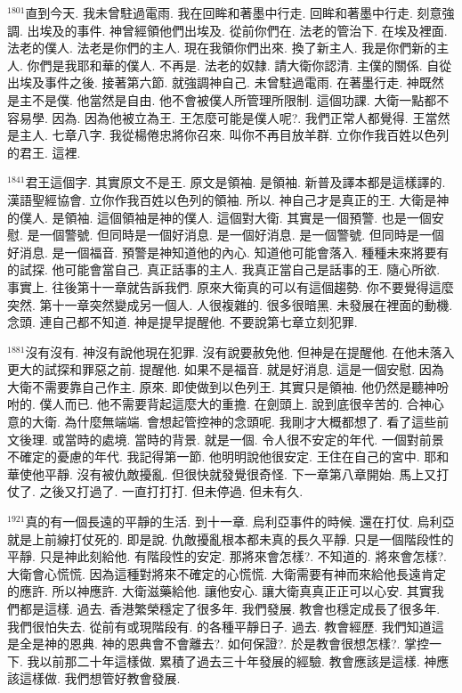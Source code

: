 \documentclass{book}
\begin{document}
$^{1801}$直到今天.
我未曾駐過電雨.
我在回眸和著墨中行走.
回眸和著墨中行走.
刻意強調.
出埃及的事件.
神曾經領他們出埃及.
從前你們在.
法老的管治下.
在埃及裡面.
法老的僕人.
法老是你們的主人.
現在我領你們出來.
換了新主人.
我是你們新的主人.
你們是我耶和華的僕人.
不再是.
法老的奴隸.
請大衛你認清.
主僕的關係.
自從出埃及事件之後.
接著第六節.
就強調神自己.
未曾駐過電雨.
在著墨行走.
神既然是主不是僕.
他當然是自由.
他不會被僕人所管理所限制.
這個功課.
大衛一點都不容易學.
因為.
因為他被立為王.
王怎麼可能是僕人呢?.
我們正常人都覺得.
王當然是主人.
七章八字.
我從楊倦忠將你召來.
叫你不再目放羊群.
立你作我百姓以色列的君王.
這裡.

$^{1841}$君王這個字.
其實原文不是王.
原文是領袖.
是領袖.
新普及譯本都是這樣譯的.
漢語聖經協會.
立你作我百姓以色列的領袖.
所以.
神自己才是真正的王.
大衛是神的僕人.
是領袖.
這個領袖是神的僕人.
這個對大衛.
其實是一個預警.
也是一個安慰.
是一個警號.
但同時是一個好消息.
是一個好消息.
是一個警號.
但同時是一個好消息.
是一個福音.
預警是神知道他的內心.
知道他可能會落入.
種種未來將要有的試探.
他可能會當自己.
真正話事的主人.
我真正當自己是話事的王.
隨心所欲.
事實上.
往後第十一章就告訴我們.
原來大衛真的可以有這個趨勢.
你不要覺得這麼突然.
第十一章突然變成另一個人.
人很複雜的.
很多很暗黑.
未發展在裡面的動機.
念頭.
連自己都不知道.
神是提早提醒他.
不要說第七章立刻犯罪.

$^{1881}$沒有沒有.
神沒有說他現在犯罪.
沒有說要赦免他.
但神是在提醒他.
在他未落入更大的試探和罪惡之前.
提醒他.
如果不是福音.
就是好消息.
這是一個安慰.
因為大衛不需要靠自己作主.
原來.
即使做到以色列王.
其實只是領袖.
他仍然是聽神吩咐的.
僕人而已.
他不需要背起這麼大的重擔.
在劍頭上.
說到底很辛苦的.
合神心意的大衛.
為什麼無端端.
會想起管控神的念頭呢.
我剛才大概都想了.
看了這些前文後理.
或當時的處境.
當時的背景.
就是一個.
令人很不安定的年代.
一個對前景不確定的憂慮的年代.
我記得第一節.
他明明說他很安定.
王住在自己的宮中.
耶和華使他平靜.
沒有被仇敵擾亂.
但很快就發覺很奇怪.
下一章第八章開始.
馬上又打仗了.
之後又打過了.
一直打打打.
但未停過.
但未有久.

$^{1921}$真的有一個長遠的平靜的生活.
到十一章.
烏利亞事件的時候.
還在打仗.
烏利亞就是上前線打仗死的.
即是說.
仇敵擾亂根本都未真的長久平靜.
只是一個階段性的平靜.
只是神此刻給他.
有階段性的安定.
那將來會怎樣?.
不知道的.
將來會怎樣?.
大衛會心慌慌.
因為這種對將來不確定的心慌慌.
大衛需要有神而來給他長遠肯定的應許.
所以神應許.
大衛滋藥給他.
讓他安心.
讓大衛真真正正可以心安.
其實我們都是這樣.
過去.
香港繁榮穩定了很多年.
我們發展.
教會也穩定成長了很多年.
我們很怕失去.
從前有或現階段有.
的各種平靜日子.
過去.
教會經歷.
我們知道這是全是神的恩典.
神的恩典會不會離去?.
如何保證?.
於是教會很想怎樣?.
掌控一下.
我以前那二十年這樣做.
累積了過去三十年發展的經驗.
教會應該是這樣.
神應該這樣做.
我們想管好教會發展.
\end{document}
